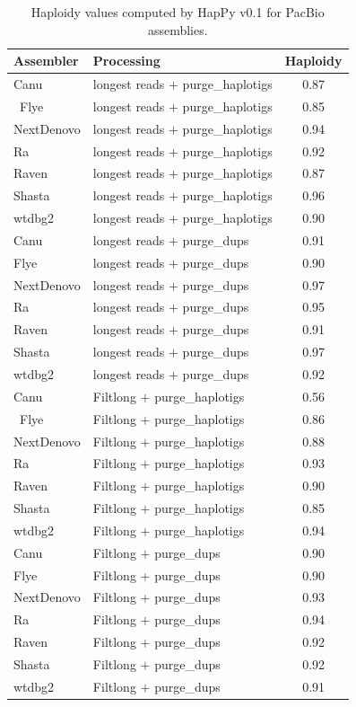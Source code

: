 \begin{table}[ht]
\centering
\caption{Haploidy values computed by HapPy v0.1 for PacBio assemblies.}
\begin{tabular}{llc}
\hline
\textbf{Assembler} & \textbf{Processing} & \textbf{Haploidy} \\
\hline
Canu & longest reads $+$ purge\_haplotigs & 0.87 \\ \
Flye & longest reads $+$ purge\_haplotigs & 0.85 \\
NextDenovo & longest reads $+$ purge\_haplotigs & 0.94 \\
Ra & longest reads $+$ purge\_haplotigs & 0.92 \\
Raven & longest reads $+$ purge\_haplotigs & 0.87 \\
Shasta & longest reads $+$ purge\_haplotigs & 0.96 \\
wtdbg2 & longest reads $+$ purge\_haplotigs & 0.90 \\
Canu & longest reads $+$ purge\_dups & 0.91 \\
Flye & longest reads $+$ purge\_dups & 0.90 \\
NextDenovo & longest reads $+$ purge\_dups & 0.97 \\
Ra & longest reads $+$ purge\_dups & 0.95 \\
Raven & longest reads $+$ purge\_dups & 0.91 \\
Shasta & longest reads $+$ purge\_dups & 0.97 \\
wtdbg2 & longest reads $+$ purge\_dups & 0.92 \\
Canu & Filtlong $+$ purge\_haplotigs & 0.56 \\ \
Flye & Filtlong $+$ purge\_haplotigs & 0.86 \\
NextDenovo & Filtlong $+$ purge\_haplotigs & 0.88 \\
Ra & Filtlong $+$ purge\_haplotigs & 0.93 \\
Raven & Filtlong $+$ purge\_haplotigs & 0.90 \\
Shasta & Filtlong $+$ purge\_haplotigs & 0.85 \\
wtdbg2 & Filtlong $+$ purge\_haplotigs & 0.94 \\
Canu & Filtlong $+$ purge\_dups & 0.90 \\
Flye & Filtlong $+$ purge\_dups & 0.90 \\
NextDenovo & Filtlong $+$ purge\_dups & 0.93 \\
Ra & Filtlong $+$ purge\_dups & 0.94 \\
Raven & Filtlong $+$ purge\_dups & 0.92 \\
Shasta & Filtlong $+$ purge\_dups & 0.92 \\
wtdbg2 & Filtlong $+$ purge\_dups & 0.91 \\
\hline
\end{tabular}
\label{tab:pacbio_happy_part2}
\end{table}

